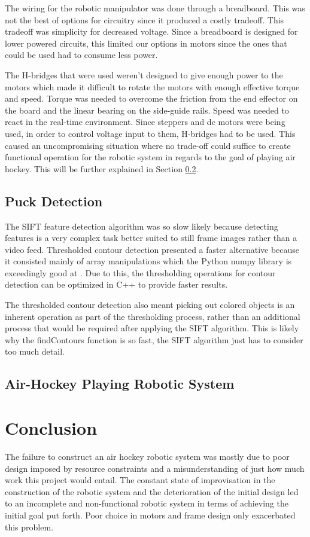 \documentclass[letterpaper, 12 pt, conference]{ieeeconf}
\begin{document}
The wiring for the robotic manipulator was done through a breadboard. This was not the best of options for circuitry since it produced a costly tradeoff.  This tradeoff was simplicity for decreased voltage.  Since a breadboard is designed for lower powered circuits, this limited our options in motors since the ones that could be used had to consume less power. 

The H-bridges that were used weren't designed to give enough power to the motors which made it difficult to rotate the motors with enough effective torque and speed.  Torque was needed to overcome the friction from the end effector on the board and the linear bearing on the side-guide rails.  Speed was needed to react in the real-time environment.  Since steppers and dc motors were being used, in order to control voltage input to them, H-bridges had to be used. This caused an uncompromising situation where no trade-off could suffice to create functional operation for the robotic system in regards to the goal of playing air hockey. This will be further explained in Section \ref{analysis-airhockeyplayingroboticsystem}.

\subsection{Puck Detection}
\label{analysis-malletmanipulation}
The SIFT feature detection algorithm was so slow likely because detecting features is a very complex task better suited to still frame images rather than a video feed. Thresholded contour detection presented a faster alternative because it consisted mainly of array manipulations which the Python numpy library is exceedingly good at \cite{numpy}. Due to this, the thresholding operations for contour detection can be optimized in C++ to provide faster results.

The thresholded contour detection also meant picking out colored objects is an inherent operation as part of the thresholding process, rather than an additional process that would be required after applying the SIFT algorithm. This is likely why the findContours function is so fast, the SIFT algorithm just has to consider too much detail.

\subsection{Air-Hockey Playing Robotic System}
\label{analysis-airhockeyplayingroboticsystem}

\section{Conclusion}
\label{conclusion}
The failure to construct an air hockey robotic system was mostly due to poor design imposed by resource constraints and a misunderstanding of just how much work this project would entail. The constant state of improvisation in the construction of the robotic system and the deterioration of the initial design led to an incomplete and non-functional robotic system in terms of achieving the initial goal put forth. Poor choice in motors and frame design only exacerbated this problem.
\end{document}
